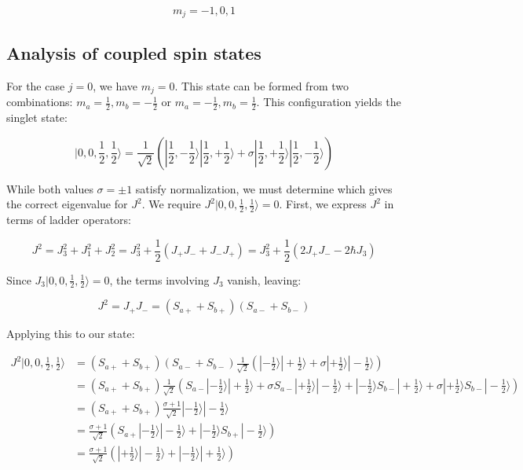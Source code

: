\documentclass[italian]{HKNdocument}
\begin{document}
\begin{equation}
m_{j}=-1,0,1 \label{eq:11.57}
\end{equation}


\subsection{Analysis of coupled spin states}
For the case $j=0$, we have $m_j=0$. This state can be formed from two combinations: $m_a=\frac{1}{2}, m_b=-\frac{1}{2}$ or $m_a=-\frac{1}{2}, m_b=\frac{1}{2}$. This configuration yields the singlet state:

\begin{equation}
|0,0,\frac{1}{2},\frac{1}{2}\rangle=\frac{1}{\sqrt{2}}(|\frac{1}{2},-\frac{1}{2}\rangle|\frac{1}{2},+\frac{1}{2}\rangle+\sigma|\frac{1}{2},+\frac{1}{2}\rangle|\frac{1}{2},-\frac{1}{2}\rangle) \label{eq:11.58}
\end{equation}

While both values $\sigma=\pm 1$ satisfy normalization, we must determine which gives the correct eigenvalue for $J^2$. We require $J^2|0,0,\frac{1}{2},\frac{1}{2}\rangle=0$. First, we express $J^2$ in terms of ladder operators:

\begin{equation}
J^{2}=J_{3}^{2}+J_{1}^{2}+J_{2}^{2}=J_{3}^{2}+\frac{1}{2}(J_{+}J_{-}+J_{-}J_{+})=J_{3}^{2}+\frac{1}{2}(2J_{+}J_{-}-2\hbar J_{3}) \label{eq:11.59}
\end{equation}

Since $J_3|0,0,\frac{1}{2},\frac{1}{2}\rangle=0$, the terms involving $J_3$ vanish, leaving:

\begin{equation}
J^{2}=J_{+}J_{-}=(S_{a+}+S_{b+})(S_{a-}+S_{b-}) \label{eq:11.60}
\end{equation}

Applying this to our state:

\begin{align}
J^{2}|0,0,\frac{1}{2},\frac{1}{2}\rangle &= (S_{a+}+S_{b+})(S_{a-}+S_{b-}) \frac{1}{\sqrt{2}}(|-\frac{1}{2}\rangle|+\frac{1}{2}\rangle+\sigma|+\frac{1}{2}\rangle|-\frac{1}{2}\rangle) \\
&= (S_{a+}+S_{b+}) \frac{1}{\sqrt{2}}(S_{a-}|-\frac{1}{2}\rangle|+\frac{1}{2}\rangle+\sigma S_{a-}|+\frac{1}{2}\rangle|-\frac{1}{2}\rangle+|-\frac{1}{2}\rangle S_{b-}|+\frac{1}{2}\rangle+\sigma|+\frac{1}{2}\rangle S_{b-}|-\frac{1}{2}\rangle) \\
&= (S_{a+}+S_{b+}) \frac{\sigma+1}{\sqrt{2}}|-\frac{1}{2}\rangle|-\frac{1}{2}\rangle \\
&= \frac{\sigma+1}{\sqrt{2}}(S_{a+}|-\frac{1}{2}\rangle|-\frac{1}{2}\rangle+|-\frac{1}{2}\rangle S_{b+}|-\frac{1}{2}\rangle) \\
&= \frac{\sigma+1}{\sqrt{2}}(|+\frac{1}{2}\rangle|-\frac{1}{2}\rangle+|-\frac{1}{2}\rangle|+\frac{1}{2}\rangle) \label{eq:11.61}
\end{align}
\end{document}

